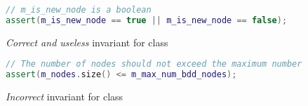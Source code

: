\begin{figure}[htp]
    \centering
\begin{lstlisting}[language=c++]
// m_is_new_node is a boolean
assert(m_is_new_node == true || m_is_new_node == false);
\end{lstlisting}
    \caption{\textit{Correct and useless} invariant for  class}
    \label{fig:bdd_correct_useless}
\end{figure}


\begin{figure}[htp]
    \centering
\begin{lstlisting}[language=c++]
// The number of nodes should not exceed the maximum number of BDD nodes
assert(m_nodes.size() <= m_max_num_bdd_nodes);
\end{lstlisting}
    \caption{\textit{Incorrect} invariant for  class}
    \label{fig:bdd_incorrect}
\end{figure}


